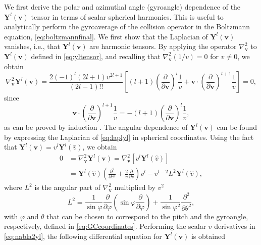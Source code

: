 We first derive the polar and azimuthal angle (gyroangle) dependence of the $\mathbf Y^l(\mathbf v)$ tensor in terms of scalar spherical harmonics.
%
This is useful to analytically perform the gyroaverage of the collision operator in the Boltzmann equation, \cref{eq:boltzmannfinal}.
%
We first show that the Laplacian of $\mathbf Y^l(\mathbf v)$ vanishes, i.e., that $\mathbf Y^l(\mathbf v)$ are harmonic tensors.
%
By applying the operator $\nabla_{\mathbf v}^2$ to $ \mathbf Y^{l}(\mathbf v)$ defined in \cref{eq:yltensor}, and recalling that $\nabla_{\mathbf v}^2 (1/v) = 0$ for $v\not=0$, we obtain
%
\begin{equation}
    \nabla_{\mathbf v}^2 \mathbf Y^{l}(\mathbf v) = \frac{2(-1)^l(2l+1)v^{2l+1}}{(2l-1)!!}\left[(l+1)\left(\frac{\partial}{\partial \mathbf v}\right)^l\frac{1}{v}+\mathbf v \cdot \left(\frac{\partial}{\partial \mathbf v}\right)^{l+1}\frac{1}{v}\right]=0,
\label{eq:laplyl}
\end{equation}
%
since
%
\begin{equation}
    \mathbf v \cdot \left(\frac{\partial}{\partial \mathbf v}\right)^{l+1}\frac{1}{v} = - (l+1)\left(\frac{\partial}{\partial \mathbf v}\right)^l\frac{1}{v},
\end{equation}
%
as can be proved by induction \citep{Weinert1980}.
%
The angular dependence of $\mathbf Y^{l}(\mathbf v)$ can be found by expressing the Laplacian of \cref{eq:laplyl} in spherical coordinates.
%
Using the fact that $\mathbf Y^l(\mathbf v) = v^l \mathbf Y^l(\hat v)$, we obtain
%
\begin{align}
    0 &= \nabla_{\mathbf v}^2 \mathbf Y^{l}(\mathbf v)=\nabla^2_{\mathbf v}[v^l \mathbf Y^l(\hat v)]\nonumber\\
      &= \mathbf Y^{l}(\hat v)\left(\frac{\partial^2}{\partial v^2} + \frac{2}{v}\frac{\partial}{\partial v}\right)v^l - v^{l-2} L^2 \mathbf Y^l(\hat v),
\label{eq:nabla2yl}
\end{align}
%
where $L^2$ is the angular part of $\nabla^2_{\mathbf v}$ multiplied by $v^2$
%
\begin{equation}
    L^2 = \frac{1}{\sin \varphi}\frac{\partial}{\partial \varphi}\left(\sin \varphi \frac{\partial}{\partial \varphi}\right)+\frac{1}{\sin \varphi^2}\frac{\partial^2}{\partial \theta^2},
\end{equation}
%
with $\varphi$ and $\theta$ that can be chosen to correspond to the pitch and the gyroangle, respectively, defined in \cref{eq:GCcoordinates}.
%
Performing the scalar $v$ derivatives in \cref{eq:nabla2yl}, the following differential equation for $\mathbf Y^l(\mathbf v)$ is obtained
